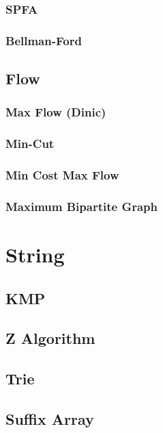 \documentclass[10pt,twocolumn,oneside]{article} %
\begin{document}
\subsubsection{SPFA}

\subsubsection{Bellman-Ford}

\subsection{Flow}

\subsubsection{Max Flow (Dinic)}

\subsubsection{Min-Cut}

\subsubsection{Min Cost Max Flow}

\subsubsection{Maximum Bipartite Graph}


\section{String}

\subsection{KMP}

\subsection{Z Algorithm}

\subsection{Trie}

\subsection{Suffix Array}
\end{document}

